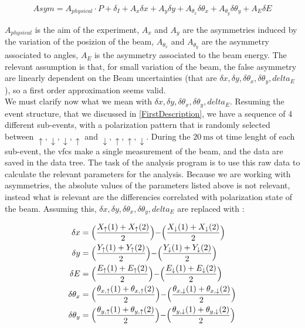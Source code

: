 \begin{equation}
Asym = A_{physical} \cdot P + \delta_{I} + A_{x} \delta x + A_{y} \delta y + A_{\theta_{x}} \delta \theta_{x} + A_{\theta_{y}} \delta \theta_{y}+ A_{E} \delta E 
\end{equation}

$A_{physical}$ is the aim of the experiment, $A_{x}$ and $A_{y}$ are the asymmetries induced by the variation of the posizion of the beam, $A_{\theta_{x}}$ and $A_{\theta_{y}}$ are the asymmetry associated to angles, $A_{E}$ is the asymmetry associated to the beam energy. 
The relevant assumption is that, for small variation of the beam, the false asymmetry are linearly dependent on the Beam uncertainties (that are $\delta x, \delta y, \delta \theta_{x}, \delta \theta_{y}, delta_{E}$), so a first order approximation seems valid.\\
We must clarify now what we mean with $\delta x, \delta y, \delta \theta_{x}, \delta \theta_{y}, delta_{E}$. Resuming the event structure, that we discussed in \ref{FirstDescription}, we have a sequence of 4 different sub-events, with a polarization pattern that is randomly selected between $\uparrow,\downarrow,\downarrow, \uparrow$ and $\downarrow,\uparrow,\uparrow,\downarrow$. During the $\SI{20}{\milli \second}$ ot time lenght of each sub-event, the vfcs make a single measurement of the beam, and the data are saved in the data tree. The task of the analysis program is to use this raw data to calculate the relevant parameters for the analysis. Because we are working with asymmetries, the absolute values of the parameters listed above is not relevant, instead what is relevant are the differencies correlated with polarization state of the beam. Assuming this, $\delta x, \delta y, \delta \theta_{x}, \delta \theta_{y}, delta_{E}$ are replaced with :

\begin{equation}
\begin{split}
\delta {x} & = \Bigl(\dfrac{X_{\uparrow}(1) + X_{\uparrow}(2)}{2}\Bigl)  - \Bigl(\dfrac{X_{\downarrow}(1) + X_{\downarrow}(2)}{2}\Bigl)\\
\delta {y} & = \Bigl(\dfrac{Y_{\uparrow}(1) + Y_{\uparrow}(2)}{2}\Bigl)  - \Bigl(\dfrac{Y_{\downarrow}(1) + Y_{\downarrow}(2)}{2}\Bigl)\\
\delta {E} & = \Bigl(\dfrac{E_{\uparrow}(1) + E_{\uparrow}(2)}{2}\Bigl)  - \Bigl(\dfrac{E_{\downarrow}(1) + E_{\downarrow}(2)}{2}\Bigl)\\
\delta {\theta_{x}} & = \Bigl( \dfrac{\theta_{x,\uparrow}(1) + \theta_{x,\uparrow}(2)}{2} \Bigl) - \Bigl(\dfrac{\theta_{x,\downarrow}(1) + \theta_{x,\downarrow}(2)}{2} \Bigl)\\
\delta {\theta_{y}} & = \Bigl( \dfrac{\theta_{y,\uparrow}(1) + \theta_{y,\uparrow}(2)}{2} \Bigl) - \Bigl(\dfrac{\theta_{y,\downarrow}(1) + \theta_{y,\downarrow}(2)}{2} \Bigl)\\ 
\end{split}
\end{equation}

